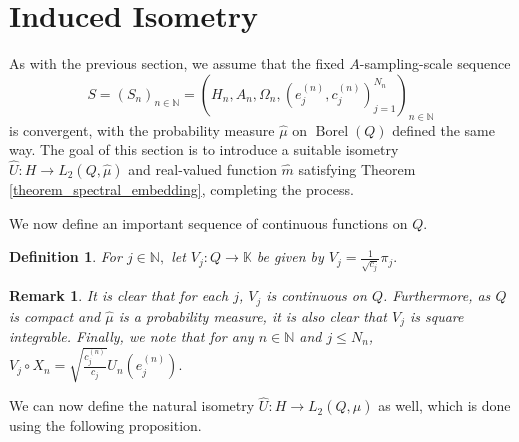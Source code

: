 \documentclass[10pt,a4paper]{amsart}
\newtheorem{definition}[thm]{Definition}
\newtheorem{remark}[thm]{Remark}
\def \Borel{\operatorname{Borel}}
\def \HMU{\hat{\mu}}
\def \HU{\hat{U}}
\def \Hm{\hat{m}}
\begin{document}
\section{Induced Isometry}
As with the previous section, we assume that the fixed $A$-sampling-scale sequence $$S=(S_n)_{n\in\mathbb{N}}=(H_n,A_n,\Omega_n,(e_j^{(n)},c_j^{(n)})_{j=1}^{N_n})_{n\in\mathbb{N}}$$ is convergent, with the probability measure $\HMU$ on $\Borel(Q)$ defined the same way. The goal of this section is to introduce a suitable isometry $\HU:H\rightarrow L_2(Q,\HMU)$ and real-valued function $\Hm$ satisfying Theorem \ref{theorem_spectral_embedding}, completing the process.
 
We now define an important sequence of continuous functions on $Q$.

\begin{definition}
	For $j\in\mathbb{N},$ let $V_j: Q\rightarrow\mathbb{K}$ be given by  $V_j=\frac{1}{\sqrt{c_j}}\pi_j.$
\end{definition}
\begin{remark}
	It is clear that for each $j$, $V_j$ is continuous on $Q$. Furthermore, as $Q$ is compact and $\HMU$ is a probability measure, it is also clear that $V_j$ is square integrable. Finally, we note that for any $n\in\mathbb{N}$ and $j\leq N_n$, $V_j\circ X_n=\sqrt{\frac{c_j^{(n)}}{c_j}}U_n(e_j^{(n)}).$
\end{remark}
We can now define the natural isometry $\HU: H\rightarrow L_2(Q,\HMU)$ as well, which is done using the following proposition.
\end{document}
